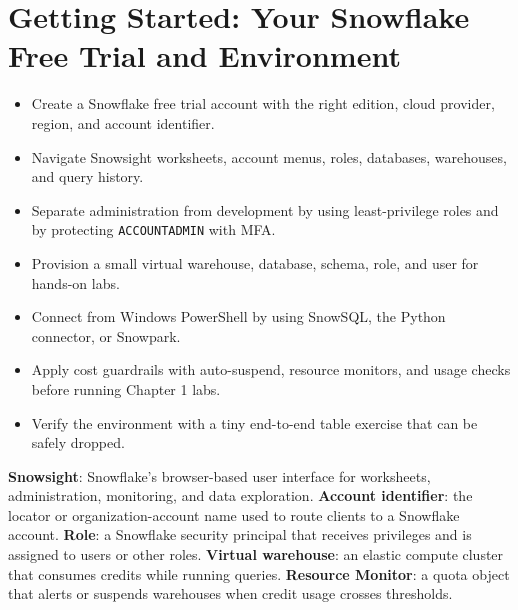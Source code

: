 \chapter{Getting Started: Your Snowflake Free Trial and Environment}
%
\begin{objectives}
\begin{itemize}
    \item Create a Snowflake free trial account with the right edition, cloud provider, region, and account identifier.
    \item Navigate Snowsight worksheets, account menus, roles, databases, warehouses, and query history.
    \item Separate administration from development by using least-privilege roles and by protecting \texttt{ACCOUNTADMIN} with MFA.
    \item Provision a small virtual warehouse, database, schema, role, and user for hands-on labs.
    \item Connect from Windows PowerShell by using SnowSQL, the Python connector, or Snowpark.
    \item Apply cost guardrails with auto-suspend, resource monitors, and usage checks before running Chapter 1 labs.
    \item Verify the environment with a tiny end-to-end table exercise that can be safely dropped.
\end{itemize}
\end{objectives}

\begin{keyterms}
\textbf{Snowsight}: Snowflake's browser-based user interface for worksheets, administration, monitoring, and data exploration.\quad
\textbf{Account identifier}: the locator or organization-account name used to route clients to a Snowflake account.\quad
\textbf{Role}: a Snowflake security principal that receives privileges and is assigned to users or other roles.\quad
\textbf{Virtual warehouse}: an elastic compute cluster that consumes credits while running queries.\quad
\textbf{Resource Monitor}: a quota object that alerts or suspends warehouses when credit usage crosses thresholds.
\end{keyterms}

